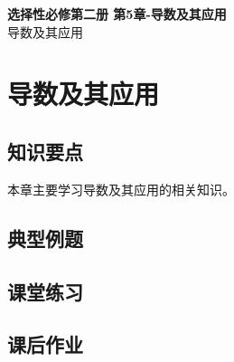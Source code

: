 \documentclass[12pt,a4paper]{article}
\begin{document}
\begin{center}
\LARGE\textbf{选择性必修第二册 第5章-导数及其应用} \\[0.5em]
\large 导数及其应用
\end{center}

\tableofcontents
\newpage

\section{导数及其应用}

\subsection{知识要点}
本章主要学习导数及其应用的相关知识。

\subsection{典型例题}

\subsection{课堂练习}

\subsection{课后作业}
\end{document}
